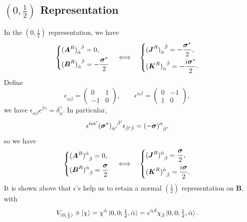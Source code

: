 \subsection{\texorpdfstring{$(0, \frac{1}{2})$ Representation}{(0,1/2) Representation}}
In the $(0, \frac{1}{2})$ representation, we have
\begin{equation}
    \begin{dcases}
        \tensor{(\boldsymbol{A}^R)}{_{\dot\alpha}^{\dot\beta}} = 0, \\
        \tensor{(\boldsymbol{B}^R)}{_{\dot\alpha}^{\dot\beta}} = - \frac{\boldsymbol{\sigma}^*}{2}
    \end{dcases}
    \quad \Longleftrightarrow \quad
    \begin{dcases}
        \tensor{(\boldsymbol{J}^R)}{_{\dot\alpha}^{\dot\beta}} = - \frac{\boldsymbol{\sigma}^*}{2}, \\
        \tensor{(\boldsymbol{K}^R)}{_{\dot\alpha}^{\dot\beta}} = - \frac{i \boldsymbol{\sigma}^*}{2}.
    \end{dcases}
\end{equation}
Define
\begin{equation}
    \epsilon_{\dot\alpha \dot\beta} = \begin{pmatrix} 0 & 1 \\
        - 1 & 0
    \end{pmatrix}, \qquad
    \epsilon^{\dot\alpha \dot\beta} = \begin{pmatrix} 0 & - 1 \\
        1 & 0
    \end{pmatrix},
\end{equation}
we have $\epsilon_{\dot\alpha \dot\beta} \epsilon^{\dot\beta \dot\gamma} = \delta_{\dot\alpha}^{\dot\gamma}$. In particular,
\begin{equation}
    \epsilon^{\dot\alpha \dot\alpha'} \tensor{(\boldsymbol{\sigma}^*)}{_{\dot\alpha'}^{\dot\beta'}} \epsilon_{\dot\beta' \dot\beta} = \tensor{(- \boldsymbol{\sigma})}{^{\dot\alpha}_{\dot\beta}},
\end{equation}
so we have
\begin{equation}
    \begin{dcases}
        \tensor{(\boldsymbol{A}^R)}{^{\dot\alpha}_{\dot\beta}} = 0, \\
        \tensor{(\boldsymbol{B}^R)}{^{\dot\alpha}_{\dot\beta}} = \frac{\boldsymbol{\sigma}}{2}
    \end{dcases}
    \quad \Longleftrightarrow \quad
    \begin{dcases}
        \tensor{(\boldsymbol{J}^R)}{^{\dot\alpha}_{\dot\beta}} = \frac{\boldsymbol{\sigma}}{2}, \\
        \tensor{(\boldsymbol{K}^R)}{^{\dot\alpha}_{\dot\beta}} = \frac{i \boldsymbol{\sigma}}{2}.
    \end{dcases}
\end{equation}
It is shown above that $\epsilon$'s help us to retain a normal $(\tfrac{1}{2})$ representation on $\boldsymbol{B}$, with
\begin{equation}
    V_{(0, \frac{1}{2})} \ni \ket{\chi} = \chi^{\dot\alpha} \ket{0, 0; \tfrac{1}{2}, \dot\alpha} = \epsilon^{\dot\alpha \dot\beta} \chi_{\dot\beta} \ket{0, 0; \tfrac{1}{2}, \dot\alpha}.
\end{equation}
